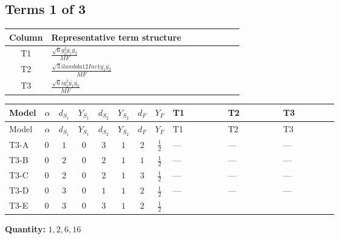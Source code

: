 \documentclass[8pt]{article}
\begin{document}
\begin{landscape}
\subsection*{Terms 1 of 3}
\begin{center}
\begin{tabular}{@{}c >{\raggedright\arraybackslash}p{0.82\linewidth}@{}}
\toprule
Column & Representative term structure \\
\midrule
T1 & \(\displaystyle \frac{\sqrt{6} g_{2}^{2} \overline{y_{1}} \overline{y_{2}}}{MF}\) \\
\midrule
T2 & \(\displaystyle \frac{\sqrt{3} i lambda12Inv1 \overline{y_{1}} \overline{y_{2}}}{MF}\) \\
\midrule
T3 & \(\displaystyle \frac{\sqrt{6} i g_{2}^{2} \overline{y_{1}} \overline{y_{2}}}{MF}\) \\
\midrule
\bottomrule
\end{tabular}
\end{center}
\smallskip
\tiny
\begin{longtable}{@{}llcccccc >{\raggedright\arraybackslash}p{0.21\linewidth} >{\raggedright\arraybackslash}p{0.21\linewidth} >{\raggedright\arraybackslash}p{0.21\linewidth}@{}}
\toprule
Model & $\alpha$ & $d_{S_1}$ & $Y_{S_1}$ & $d_{S_2}$ & $Y_{S_2}$ & $d_F$ & $Y_F$ & T1 & T2 & T3 \\
\midrule
\endfirsthead
\toprule
Model & $\alpha$ & $d_{S_1}$ & $Y_{S_1}$ & $d_{S_2}$ & $Y_{S_2}$ & $d_F$ & $Y_F$ & T1 & T2 & T3 \\
\midrule
\endhead
T3-A & $0$ & $1$ & $0$ & $3$ & $1$ & $2$ & $\frac{1}{2}$ & --- & --- & --- \\
\midrule
T3-B & $0$ & $2$ & $0$ & $2$ & $1$ & $1$ & $\frac{1}{2}$ & --- & --- & --- \\
\midrule
T3-C & $0$ & $2$ & $0$ & $2$ & $1$ & $3$ & $\frac{1}{2}$ & --- & --- & --- \\
\midrule
T3-D & $0$ & $3$ & $0$ & $1$ & $1$ & $2$ & $\frac{1}{2}$ & --- & --- & --- \\
\midrule
T3-E & $0$ & $3$ & $0$ & $3$ & $1$ & $2$ & $\frac{1}{2}$ & \scriptsize\adjustbox{max width=\linewidth}{$\begin{gathered} - \frac{\sqrt{6} g_{2}^{2} \overline{y_{1}} \overline{y_{2}}}{6 MF}\end{gathered}$} & \scriptsize\adjustbox{max width=\linewidth}{$\begin{gathered} - \frac{\sqrt{3} i lambda12Inv1 \overline{y_{1}} \overline{y_{2}}}{6 MF}\end{gathered}$} & \scriptsize\adjustbox{max width=\linewidth}{$\begin{gathered} \frac{\sqrt{6} i g_{2}^{2} \overline{y_{1}} \overline{y_{2}}}{6 MF}\end{gathered}$} \\
\midrule
\bottomrule
\end{longtable}
\clearpage
\noindent\textbf{Quantity: }$\mathrm{1,2,6,16}$\par\smallskip

\end{landscape}
\end{document}

